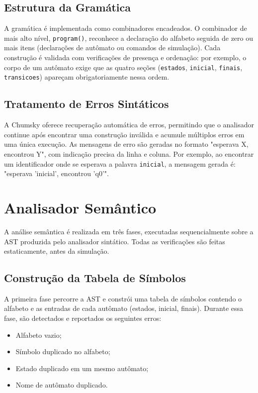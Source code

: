 \documentclass[
    12pt
    ,oneside
    ,a4paper
    ,chapter=TITLE
    ,section=TITLE
    ,sumario=abnt-6027-2012]{abntex2}
\begin{document}
\subsection{Estrutura da Gramática}
\label{sec:impl-gramatica}

A gramática é implementada como combinadores encadeados. O combinador de mais alto
nível, \texttt{program()}, reconhece a declaração do alfabeto seguida de zero ou mais
itens (declarações de autômato ou comandos de simulação). Cada construção é validada
com verificações de presença e ordenação: por exemplo, o corpo de um autômato exige
que as quatro seções (\texttt{estados}, \texttt{inicial}, \texttt{finais},
\texttt{transicoes}) apareçam obrigatoriamente nessa ordem.

\subsection{Tratamento de Erros Sintáticos}
\label{sec:impl-erros-sintaticos}

A Chumsky oferece recuperação automática de erros, permitindo que o analisador
continue após encontrar uma construção inválida e acumule múltiplos erros em uma única
execução. As mensagens de erro são geradas no formato "esperava X, encontrou Y", com
indicação precisa da linha e coluna. Por exemplo, ao encontrar um identificador onde
se esperava a palavra \texttt{inicial}, a mensagem gerada é: "esperava 'inicial',
encontrou 'q0'".

\section{Analisador Semântico}
\label{sec:impl-sema}

A análise semântica é realizada em três fases, executadas sequencialmente sobre a AST
produzida pelo analisador sintático. Todas as verificações são feitas estaticamente,
antes da simulação.

\subsection{Construção da Tabela de Símbolos}
\label{sec:impl-tabela}

A primeira fase percorre a AST e constrói uma tabela de símbolos contendo o alfabeto
e as entradas de cada autômato (estados, inicial, finais). Durante essa fase, são
detectados e reportados os seguintes erros:

\begin{itemize}
    \item Alfabeto vazio;
    \item Símbolo duplicado no alfabeto;
    \item Estado duplicado em um mesmo autômato;
    \item Nome de autômato duplicado.
\end{itemize}
\end{document}

